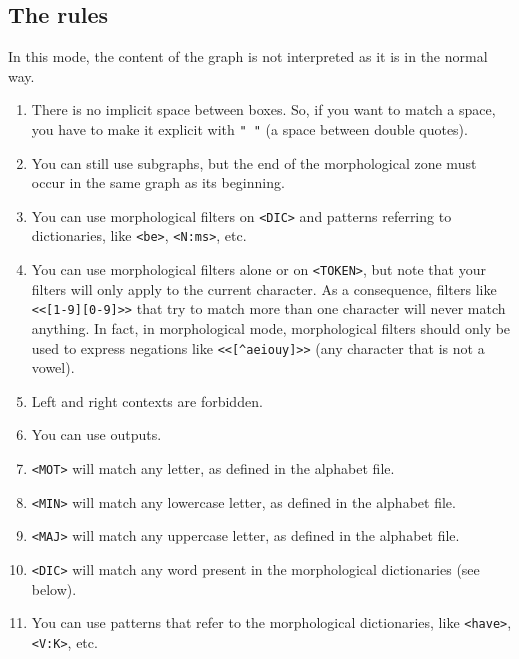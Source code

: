 \subsection{The rules}
In this mode, the content of the graph is not interpreted as it is
in the normal way.
\begin{enumerate}
  \item There is no implicit space between boxes. So, if you
want to match a space, you have to make it explicit with \verb+" "+ (a space
between double quotes).

   \item You can still use subgraphs, but the end of the morphological zone
   must occur in the same graph as its beginning.

   \item You can use morphological filters on \verb+<DIC>+ and patterns
   referring to dictionaries, like \verb+<be>+, \verb+<N:ms>+, etc. 
   
   \item You can use morphological filters alone or on \verb+<TOKEN>+,
   but note that your filters will only apply to the current character. As a
   consequence, filters like \verb+<<[1-9][0-9]>>+ that try to match more than
   one character will never match anything. In fact, in morphological mode, 
   morphological filters should only be used to express negations like 
   \verb+<<[^aeiouy]>>+ (any character that is not a vowel). 
   
   
   \item Left and right contexts are forbidden.

   \item You can use outputs.
   
    \item \verb+<MOT>+ will match any letter, as defined in the alphabet
    file.

    \item \verb+<MIN>+ will match any lowercase letter, as defined in the
    alphabet file.

    \item \verb+<MAJ>+ will match any uppercase letter, as defined in the
    alphabet file.

    \item \verb+<DIC>+ will match any word present in the morphological
    dictionaries (see below).

    \item You can use patterns that refer to the morphological dictionaries,
    like \verb+<have>+, \verb+<V:K>+, etc. 


\end{enumerate}
